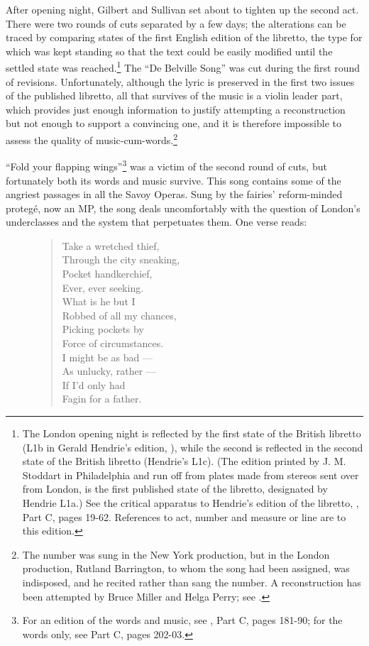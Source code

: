 \begin{paper}
After opening night, Gilbert and Sullivan set about to tighten up the
second act. There were two rounds of cuts separated by a few days; the
alterations can be traced by comparing states of the first English
edition of the libretto, the type for which was kept standing so that
the text could be easily modified until the settled state was
reached.\footnote{The London opening night is reflected by the first
  state of the British libretto (L1b in Gerald Hendrie's edition,
  \citealt{gilbert_iolanthe_2017}), while the second is reflected in the second
  state of the British libretto (Hendrie's L1c). (The edition printed by
  J. M. Stoddart in Philadelphia and run off from plates made from
  stereos sent over from London, is the first published state of the
  libretto, designated by Hendrie L1a.) See the critical apparatus to
  Hendrie's edition of the libretto, \citealt{gilbert_iolanthe_2017}, Part C,
  pages 19-62. References to act, number and measure or line are to this
  edition.} The ``De Belville Song'' was cut during the first round of
revisions. Unfortunately, although the lyric is preserved in the first
two issues of the published libretto, all that survives of the music is
a violin leader part, which provides just enough information to justify
attempting a reconstruction but not enough to support a convincing one,
and it is therefore impossible to assess the quality of
music-cum-words.\footnote{The number was sung in the New York
  production, but in the London production, Rutland Barrington, to whom
  the song had been assigned, was indisposed, and he recited rather than
  sang the number. A reconstruction has been attempted by Bruce Miller
  and Helga Perry; see \citealt{miller_reward_2000}.}

``Fold your flapping wings''\footnote{For an edition of the words and music, see
  \citealt{gilbert_iolanthe_2017}, Part C, pages 181-90; for the words only, see Part C, pages 202-03.} was a victim of the second round of cuts,
but fortunately both its words and music survive. This song contains
some of the angriest passages in all the Savoy Operas. Sung by the
fairies' reform-minded protegé, now an MP, the song deals uncomfortably
with the question of London's underclasses and the system that
perpetuates them. One verse reads:

\begin{figure}[H]
\begin{quote}
Take a wretched thief,\\
Through the city sneaking,\\
Pocket handkerchief,\\
Ever, ever seeking.\\
What is he but I\\
Robbed of all my chances,\\
Picking pockets by\\
Force of circumstances.\\
I might be as bad ---\\
As unlucky, rather ---\\
If I'd only had\\
Fagin for a father.
\end{quote}
\end{figure}


\end{paper}

